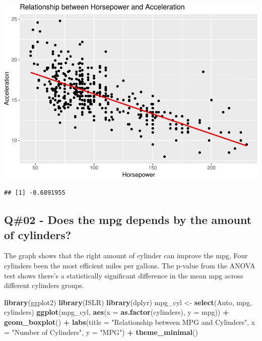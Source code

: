 \documentclass[
]{article}
\newenvironment{Shaded}{\begin{snugshade}}{\end{snugshade}}
\newcommand{\AttributeTok}[1]{\textcolor[rgb]{0.13,0.29,0.53}{#1}}
\newcommand{\FunctionTok}[1]{\textcolor[rgb]{0.13,0.29,0.53}{\textbf{#1}}}
\newcommand{\NormalTok}[1]{#1}
\newcommand{\OtherTok}[1]{\textcolor[rgb]{0.56,0.35,0.01}{#1}}
\newcommand{\SpecialCharTok}[1]{\textcolor[rgb]{0.81,0.36,0.00}{\textbf{#1}}}
\newcommand{\StringTok}[1]{\textcolor[rgb]{0.31,0.60,0.02}{#1}}
\begin{document}
\includegraphics{QuestionCar_files/figure-latex/unnamed-chunk-1-1.pdf}

\begin{Shaded}
\end{Shaded}

\begin{verbatim}
## [1] -0.6891955
\end{verbatim}

\newpage

\hypertarget{q02---does-the-mpg-depends-by-the-amount-of-cylinders}{%
\subsection{Q\#02 - Does the mpg depends by the amount of
cylinders?}\label{q02---does-the-mpg-depends-by-the-amount-of-cylinders}}

The graph shows that the right amount of cylinder can improve the mpg,
Four cylinders been the most efficient miles per gallons. The p-value
from the ANOVA test shows there's a statistically significant difference
in the mean mpg across different cylinders groups.

\begin{Shaded}
\begin{Highlighting}[]
\FunctionTok{library}\NormalTok{(ggplot2)}
\FunctionTok{library}\NormalTok{(ISLR)}
\FunctionTok{library}\NormalTok{(dplyr)}
\NormalTok{mpg\_cyl }\OtherTok{\textless{}{-}} \FunctionTok{select}\NormalTok{(Auto, mpg, cylinders)}
\FunctionTok{ggplot}\NormalTok{(mpg\_cyl, }\FunctionTok{aes}\NormalTok{(}\AttributeTok{x =} \FunctionTok{as.factor}\NormalTok{(cylinders), }\AttributeTok{y =}\NormalTok{ mpg)) }\SpecialCharTok{+}
  \FunctionTok{geom\_boxplot}\NormalTok{() }\SpecialCharTok{+}
  \FunctionTok{labs}\NormalTok{(}\AttributeTok{title =} \StringTok{"Relationship between MPG and Cylinders"}\NormalTok{,}
       \AttributeTok{x =} \StringTok{"Number of Cylinders"}\NormalTok{,}
       \AttributeTok{y =} \StringTok{"MPG"}\NormalTok{) }\SpecialCharTok{+}
  \FunctionTok{theme\_minimal}\NormalTok{()}
\end{Highlighting}
\end{Shaded}
\end{document}
